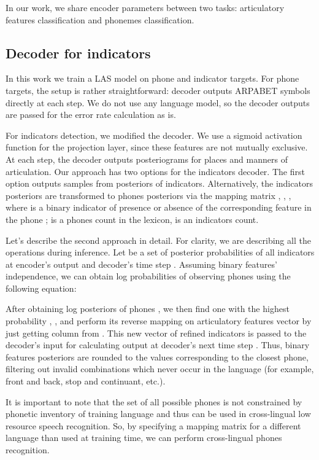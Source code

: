 \documentclass[a4paper]{article}
\begin{document}
In our work, we share encoder parameters between two tasks: articulatory features classification and phonemes classification.

\subsection{Decoder for indicators}
In this work we train a LAS model on phone and indicator targets. For phone targets, the setup is rather straightforward: decoder outputs ARPABET symbols directly at each step. We do not use any language model, so the decoder outputs are passed for the error rate calculation as is.

For indicators detection, we modified the decoder. We use a sigmoid activation function for the projection layer, since these features are not mutually exclusive. At each step, the decoder outputs posteriograms for places and manners of articulation. Our approach has two options for the indicators decoder. The first option outputs samples from posteriors of indicators. Alternatively, the indicators posteriors are transformed to phones posteriors via the mapping matrix , , , where  is a binary indicator of presence or absence of the corresponding feature  in the phone ;  is a phones count in the lexicon,  is an indicators count.

Let's describe the second approach in detail. For clarity, we are describing all the operations during inference. Let  be a set of posterior probabilities  of all indicators at encoder's output and decoder's time step . Assuming binary features' independence, we can obtain log probabilities of observing phones  using the following equation:


After obtaining log posteriors of phones , we then find one with the highest probability , , and perform its reverse mapping on articulatory features vector by just getting column  from . This new vector of refined indicators is passed to the decoder's input for calculating output at decoder's next time step . Thus, binary features posteriors are rounded to the values corresponding to the closest phone, filtering out invalid combinations which never occur in the language (for example, front and back, stop and continuant, etc.).

It is important to note that the set  of all possible phones is not constrained by phonetic inventory of training language and thus can be used in cross-lingual low resource speech recognition. So, by specifying a mapping matrix for a different language than used at training time, we can perform cross-lingual phones recognition.
\end{document}
